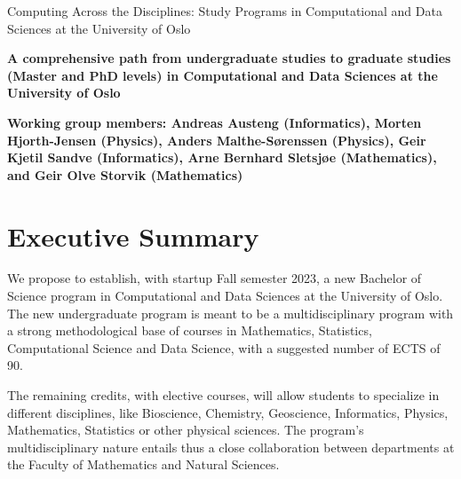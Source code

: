 \documentclass[oneside,final,10pt]{article}
\begin{document}
\thispagestyle{empty}

\begin{center}
{\LARGE\bf
\begin{spacing}{1.25}
Computing Across the Disciplines: Study Programs in Computational and Data Sciences at the University of Oslo
\end{spacing}
}
\end{center}

\begin{center}
{\bf A comprehensive path from undergraduate studies to graduate studies (Master and PhD levels) in Computational and Data Sciences at the University of Oslo }\\ [0mm]
\end{center}

\begin{center}
{\bf Working group members: Andreas Austeng (Informatics), Morten Hjorth-Jensen (Physics), Anders Malthe-S\o renssen (Physics), Geir Kjetil Sandve (Informatics), Arne Bernhard Sletsjøe (Mathematics), and Geir Olve Storvik (Mathematics) }\\ [0mm]
\end{center}

\vspace{1cm}


\section*{Executive Summary}

We propose to establish, with startup Fall semester 2023, a new Bachelor of Science program in Computational and Data Sciences at the University of Oslo. 
The new undergraduate program is meant to be a multidisciplinary program with  a strong methodological base of courses in Mathematics, Statistics, Computational Science and Data Science, with a suggested number of ECTS of 90. 

The remaining credits, with elective courses, will allow students to specialize in different disciplines, like Bioscience, Chemistry, Geoscience, Informatics, Physics, Mathematics, Statistics or other physical sciences. The program's multidisciplinary nature entails thus a close collaboration between departments at the Faculty of Mathematics and Natural Sciences.  
\end{document}
